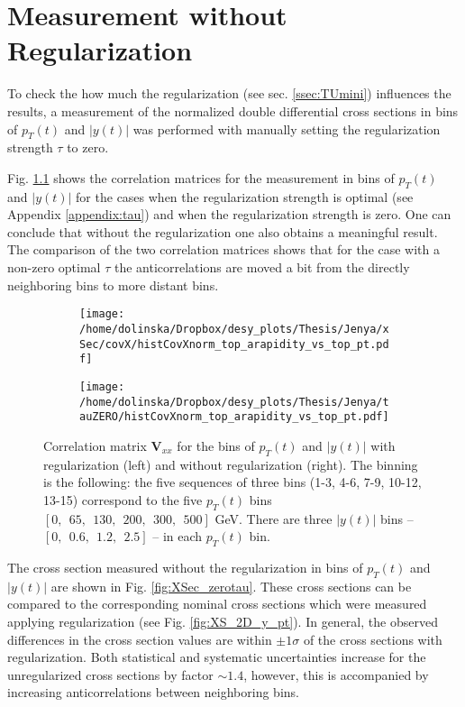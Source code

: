 \chapter{Measurement without Regularization}\label{appendix:tau_zero}

To check the how much the regularization (see sec. \ref{ssec:TUmini}) influences the results, a measurement of the 
normalized double differential cross sections in bins of $p_{T}(t)$ and $|y(t)|$ was performed with manually setting the regularization
strength $\tau$ to zero.

Fig. \ref{fig:corr_dtau} shows the correlation matrices for the measurement in bins of $p_{T}(t)$ and $|y(t)|$ for the cases when the 
regularization strength is optimal (see Appendix \ref{appendix:tau}) and when the regularization strength is zero. One can conclude 
that without the regularization one also obtains a meaningful result. The comparison of the two correlation matrices shows that 
for the case with a non-zero optimal $\tau$ the anticorrelations are moved a bit from the directly neighboring bins to more 
distant bins.

\begin{figure}[h]
\centering
\begin{subfigure}
  \centering
  \texttt{[image: /home/dolinska/Dropbox/desy\_plots/Thesis/Jenya/xSec/covX/histCovXnorm\_top\_arapidity\_vs\_top\_pt.pdf]}
\end{subfigure}
\begin{subfigure}
  \centering
  \texttt{[image: /home/dolinska/Dropbox/desy\_plots/Thesis/Jenya/tauZERO/histCovXnorm\_top\_arapidity\_vs\_top\_pt.pdf]}
\end{subfigure}
\caption{Correlation matrix $\mathbf{V}_{xx}$ for the bins of $p_{T}(t)$ and $|y(t)|$ with regularization (left) and without regularization 
        (right). The binning is the following: the five sequences of three bins (1-3, 4-6, 7-9, 10-12, 13-15) correspond to the five $p_{T}(t)$ 
        bins $[0,\:\:65,\:\:130,\:\:200,\:\:300,\:\:500]$ GeV. There are three $|y(t)|$ bins -- $[0,\:\:0.6,\:\:1.2,\:\:2.5]$ -- 
        in each $p_{T}(t)$ bin.}
\label{fig:corr_dtau}
\end{figure}

The cross section measured without the regularization in bins of $p_{T}(t)$ and $|y(t)|$ are shown in Fig. \ref{fig:XSec_zerotau}.
These cross sections can be compared to the corresponding nominal cross sections which were measured applying regularization
(see Fig. \ref{fig:XS_2D_y_pt}). In general, the observed differences in the cross section values are within $\pm 1\sigma$ of
the cross sections with regularization. Both statistical and systematic uncertainties increase for the unregularized cross sections 
by factor $\sim 1.4$, however, this is accompanied by increasing anticorrelations between neighboring bins.

